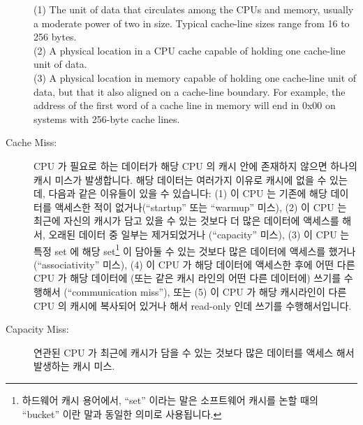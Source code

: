 \begin{description}
	(1) The unit of data that circulates among the CPUs and memory,
	usually a moderate power of two in size.
	Typical cache-line sizes range from 16 to 256 bytes. \\
	(2) A physical location in a CPU cache capable of holding
	one cache-line unit of data. \\
	(3) A physical location in memory capable of holding one
	cache-line unit of data, but that it also aligned
	on a cache-line boundary.
	For example, the address of the first word of a cache line
	in memory will end in 0x00 on systems with 256-byte cache lines.
	\fi
\item[Cache Miss:]
	CPU 가 필요로 하는 데이터가 해당 CPU 의 캐시 안에 존재하지 않으면
	하나의 캐시 미스가 발생합니다.
	해당 데이터는 여러가지 이유로 캐시에 없을 수 있는데, 다음과 같은
	이유들이 있을 수 있습니다:
	(1) 이 CPU 는 기존에 해당 데이터를 액세스한 적이 없거나(``startup''
	또는 ``warmup'' 미스),
	(2) 이 CPU 는 최근에 자신의 캐시가 담고 있을 수 있는 것보다 더 많은
	데이터에 액세스를 해서, 오래된 데이터 중 일부는 제거되었거나
	(``capacity'' 미스),
	(3) 이 CPU 는 특정 set 에 해당 set\footnote{
		하드웨어 캐시 용어에서, ``set'' 이라는 말은 소프트웨어 캐시를
		논할 때의 ``bucket'' 이란 말과 동일한 의미로 사용됩니다.}
	이 담아둘 수 있는 것보다 많은 데이터에 액세스를 했거나
	(``associativity'' 미스),
	(4) 이 CPU 가 해당 데이터에 액세스한 후에 어떤 다른 CPU 가 해당
	데이터에 (또는 같은 캐시 라인의 어떤 다른 데이터에) 쓰기를 수행해서
	(``communication miss''), 또는
	(5) 이 CPU 가 해당 캐시라인이 다른 CPU 의 캐시에 복사되어 있거나 해서
	read-only 인데 쓰기를 수행해서입니다.
	\iffalse

	A cache miss occurs when data needed by the CPU is not in
	that CPU's cache.
	The data might be missing because of a number of reasons,
	including:
	(1) this CPU has never accessed the data before
	(``startup'' or ``warmup'' miss),
	(2) this CPU has recently accessed more
	data than would fit in its cache, so that some of the older
	data had to be removed (``capacity'' miss),
	(3) this CPU
	has recently accessed more data in a given set\footnote{
		In hardware-cache terminology, the word ``set''
		is used in the same way that the word ``bucket''
		is used when discussing software caches.}
	than that set could hold (``associativity'' miss),
	(4) some other CPU has written to the data (or some other
	data in the same cache line) since this CPU has accessed it
	(``communication miss''), or
	(5) this CPU attempted to write to a cache line that is
	currently read-only, possibly due to that line being replicated
	in other CPUs' caches.
	\fi
\item[Capacity Miss:]
	연관된 CPU 가 최근에 캐시가 담을 수 있는 것보다 많은 데이터를 액세스
	해서 발생하는 캐시 미스.
	\iffalse


\end{description}
